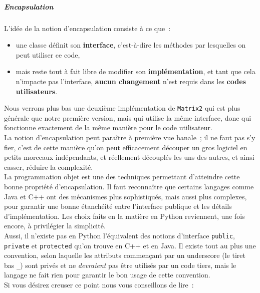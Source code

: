     \hypertarget{encapsulation}{%
\subparagraph{Encapsulation}\label{encapsulation}}

    L'idée de la notion d'encapsulation consiste à ce que~:

\begin{itemize}
\tightlist
\item
  une classe définit son \textbf{interface}, c'est-à-dire les méthodes
  par lesquelles on peut utiliser ce code,
\item
  mais reste tout à fait libre de modifier son \textbf{implémentation},
  et tant que cela n'impacte pas l'interface, \textbf{aucun changement}
  n'est requis dans les \textbf{codes utilisateurs}.
\end{itemize}

    Nous verrons plus bas une deuxième implémentation de \texttt{Matrix2}
qui est plus générale que notre première version, mais qui utilise la
même interface, donc qui fonctionne exactement de la même manière pour
le code utilisateur.\\

    La notion d'encapsulation peut paraître à première vue banale~; il ne
faut pas s'y fier, c'est de cette manière qu'on peut efficacement
découper un gros logiciel en petits morceaux indépendants, et réellement
découplés les uns des autres, et ainsi casser, réduire la complexité.\\

La programmation objet est une des techniques permettant d'atteindre
cette bonne propriété d'encapsulation. Il faut reconnaître que certains
langages comme Java et C++ ont des mécanismes plus sophistiqués, mais
aussi plus complexes, pour garantir une bonne étanchéité entre
l'interface publique et les détails d'implémentation. Les choix faits en
la matière en Python reviennent, une fois encore, à privilégier la
simplicité.\\

Aussi, il n'existe pas en Python l'équivalent des notions d'interface
\texttt{public}, \texttt{private} et \texttt{protected} qu'on trouve en
C++ et en Java. Il existe tout au plus une convention, selon laquelle
les attributs commençant par un underscore (le tiret bas \texttt{\_})
sont privés et ne \emph{devraient} pas être utilisés par un code tiers,
mais le langage ne fait rien pour garantir le bon usage de cette
convention.\\

Si vous désirez creuser ce point nous vous conseillons de lire~:

